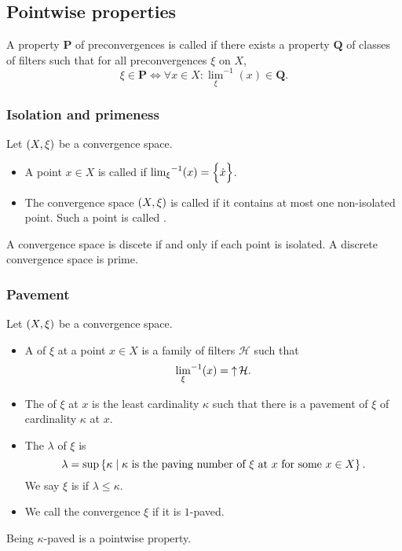 \subsection{Pointwise properties}
\begin{definition}
A property $\mathbf{P}$ of preconvergences is called  if there exists a property $\mathbf{Q}$ of classes of filters such that for all preconvergences $\xi$ on $X$,
\[ \xi \in \mathbf{P} \iff \forall x\in X: {\lim_\xi}^{-1}(x) \in \mathbf{Q}. \]
\end{definition}

\subsubsection{Isolation and primeness}
\begin{definition}
Let $\left( X,\xi \right)$ be a convergence space.
\begin{itemize}
\item A point $x\in X$ is called  if ${\lim_\xi}^{-1}(x) = \Big\{ \dot{x} \Big\}$.
\item The convergence space $\left( X,\xi \right)$ is called  if it contains at most one non-isolated point. Such a point is called .
\end{itemize}
\end{definition}

A convergence space is discete if and only if each point is isolated. A discrete convergence space is prime.

\subsubsection{Pavement}
\begin{definition}
Let $\left( X,\xi \right)$ be a convergence space.
\begin{itemize}
\item A  of $\xi$ at a point $x\in X$ is a family of filters $\mathcal{H}$ such that
\[ {\lim_\xi}^{-1}(x) = \operatorname{\uparrow}\mathcal{H}. \]
\item The  of $\xi$ at $x$ is the least cardinality $\kappa$ such that there is a pavement of $\xi$ of cardinality $\kappa$ at $x$.
\item The  $\lambda$ of $\xi$ is
\[ \lambda = \sup\left\{ \kappa \;\middle|\; \text{$\kappa$ is the paving number of $\xi$ at $x$ for some $x\in X$} \right\}. \]
We say $\xi$ is  if $\lambda \leq \kappa$.
\item We call the convergence $\xi$  if it is $1$-paved.
\end{itemize}
\end{definition}
Being $\kappa$-paved is a pointwise property.

